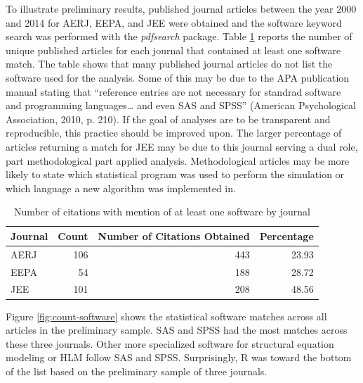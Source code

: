 \documentclass[english,man]{apa6}
\theoremstyle{definition}
\theoremstyle{definition}
\theoremstyle{definition}
\theoremstyle{remark}
\begin{document}
To illustrate preliminary results, published journal articles between
the year 2000 and 2014 for AERJ, EEPA, and JEE were obtained and the
software keyword search was performed with the \emph{pdfsearch} package.
Table \ref{tab:setup} reports the number of unique published articles
for each journal that contained at least one software match. The table
shows that many published journal articles do not list the software used
for the analysis. Some of this may be due to the APA publication manual
stating that \enquote{reference entries are not necessary for standrad
software and programming languages\ldots{} and even SAS and SPSS}
(American Psychological Association, 2010, p. 210). If the goal of
analyses are to be transparent and reproducible, this practice should be
improved upon. The larger percentage of articles returning a match for
JEE may be due to this journal serving a dual role, part methodological
part applied analysis. Methodological articles may be more likely to
state which statistical program was used to perform the simulation or
which language a new algorithm was implemented in.

\begin{table}

\caption{\label{tab:setup}Number of citations with mention of at least one software by journal}
\centering
\begin{tabular}[t]{lrrr}
\toprule
Journal & Count & Number of Citations Obtained & Percentage\\
\midrule
AERJ & 106 & 443 & 23.93\\
EEPA & 54 & 188 & 28.72\\
JEE & 101 & 208 & 48.56\\
\bottomrule
\end{tabular}
\end{table}

Figure \ref{fig:count-software} shows the statistical software matches
across all articles in the preliminary sample. SAS and SPSS had the most
matches across these three journals. Other more specialized software for
structural equation modeling or HLM follow SAS and SPSS. Surprisingly, R
was toward the bottom of the list based on the preliminary sample of
three journals.
\end{document}
